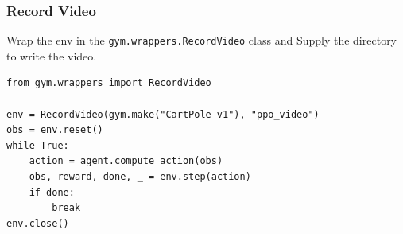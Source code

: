 \begin{frame}[fragile]\frametitle{Record Video}

Wrap the env in the \lstinline|gym.wrappers.RecordVideo| class and Supply the directory to write the video.

\begin{lstlisting}
from gym.wrappers import RecordVideo

env = RecordVideo(gym.make("CartPole-v1"), "ppo_video")
obs = env.reset()
while True:
    action = agent.compute_action(obs)
    obs, reward, done, _ = env.step(action)
    if done:
        break
env.close()
\end{lstlisting}

\end{frame}
